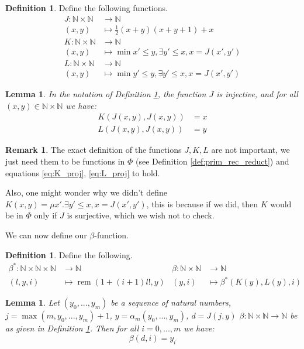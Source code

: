 \documentclass[12pt]{article}
\theoremstyle{plain}
\newtheorem{lemma}[thm]{Lemma}
\theoremstyle{definition}
\newtheorem{defn}[thm]{Definition} %
\newtheorem{remark}[thm]{Remark}
\newcommand{\bb}[1]{\mathbb{#1}}
\newcommand{\lto}{\longrightarrow}
\begin{document}
	\begin{defn}\label{def:intermediate_beta_func}
		Define the following functions.
		\begin{align}
			J: \bb{N} \times \bb{N} &\lto \bb{N}\\
			(x,y) &\longmapsto \frac{1}{2}(x + y)(x + y + 1) + x\\
			K: \bb{N} \times \bb{N} &\lto \bb{N}\\
			(x,y) &\longmapsto \operatorname{min}x' \leq y, \exists y' \leq x, x = J(x',y')\\
			L: \bb{N} \times \bb{N} &\lto \bb{N}\\
			(x,y) &\longmapsto \operatorname{min}y' \leq y, \exists y' \leq x, x = J(x',y')
		\end{align}
	\end{defn}
	\begin{lemma}
		In the notation of Definition \ref{def:intermediate_beta_func}, the function $J$ is injective, and for all $(x,y) \in \bb{N} \times \bb{N}$ we have:
		\begin{align}
			\label{eq:K_proj}K(J(x,y),J(x,y)) &= x\\
			\label{eq:L_proj}L(J(x,y),J(x,y)) &= y
		\end{align}
	\end{lemma}
	\begin{remark}
		The exact definition of the functions $J,K,L$ are not important, we just need them to be functions in $\Phi$ (see Definition \ref{def:prim_rec_reduct}) and equations \eqref{eq:K_proj}, \eqref{eq:L_proj} to hold.
		
		Also, one might wonder why we didn't define $K(x,y) = \mu x'. \exists y' \leq x, x = J(x',y')$, this is because if we did, then $K$ would be in $\Phi$ only if $J$ is surjective, which we wish not to check.
	\end{remark}
	We can now define our $\beta$-function.
	\begin{defn}\label{def:the_beta_function}
		Define the following.
		\begin{align}
			\beta^\ast: \bb{N} \times \bb{N} \times \bb{N} &\lto \bb{N} & \beta: \bb{N} \times \bb{N} &\lto \bb{N}\\
			(l,y,i) &\longmapsto \operatorname{rem}(1 + (i + 1)l!,y) & (y,i) &\longmapsto \beta^\ast(K(y),L(y),i)
		\end{align}
	\end{defn}
	\begin{lemma}
		Let $(y_0,...,y_m)$ be a sequence of natural numbers, $j = \operatorname{max}(m,y_0,...,y_m) + 1$, $y = \alpha_m(y_0,...,y_m)$, $d = J(j,y)$ $\beta: \bb{N} \times \bb{N} \lto \bb{N}$ be as given in Definition \ref{def:the_beta_function}. Then for all $i = 0,...,m$ we have:
		\begin{equation}
			\beta(d,i) = y_i
		\end{equation}
	\end{lemma}
\end{document}
